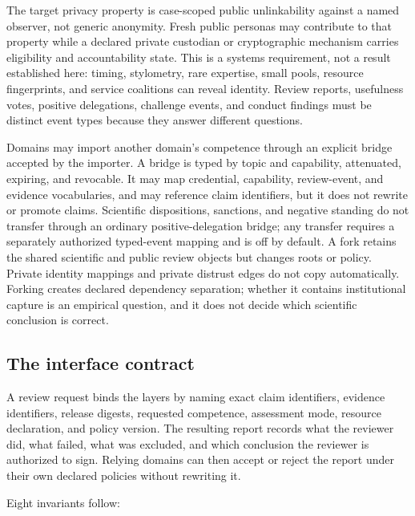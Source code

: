 \documentclass[11pt]{article}
\begin{document}

The target privacy property is case-scoped public unlinkability against a named observer, not generic anonymity. Fresh public personas may contribute to that property while a declared private custodian or cryptographic mechanism carries eligibility and accountability state. This is a systems requirement, not a result established here: timing, stylometry, rare expertise, small pools, resource fingerprints, and service coalitions can reveal identity. Review reports, usefulness votes, positive delegations, challenge events, and conduct findings must be distinct event types because they answer different questions.

Domains may import another domain's competence through an explicit bridge accepted by the importer. A bridge is typed by topic and capability, attenuated, expiring, and revocable. It may map credential, capability, review-event, and evidence vocabularies, and may reference claim identifiers, but it does not rewrite or promote claims. Scientific dispositions, sanctions, and negative standing do not transfer through an ordinary positive-delegation bridge; any transfer requires a separately authorized typed-event mapping and is off by default. A fork retains the shared scientific and public review objects but changes roots or policy. Private identity mappings and private distrust edges do not copy automatically. Forking creates declared dependency separation; whether it contains institutional capture is an empirical question, and it does not decide which scientific conclusion is correct.

\subsection{The interface contract}

A review request binds the layers by naming exact claim identifiers, evidence identifiers, release digests, requested competence, assessment mode, resource declaration, and policy version. The resulting report records what the reviewer did, what failed, what was excluded, and which conclusion the reviewer is authorized to sign. Relying domains can then accept or reject the report under their own declared policies without rewriting it.

Eight invariants follow:
\end{document}
